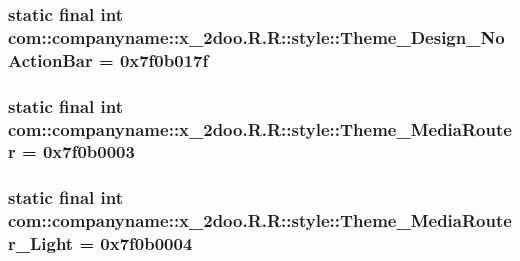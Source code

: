 \hypertarget{classcom_1_1companyname_1_1x__2doo_1_1_r_1_1style_4f51a6c9f0caaacc7bfe8180321de0b0}{
\subsubsection[{Theme\_\-Design\_\-NoActionBar}]{\setlength{\rightskip}{0pt plus 5cm}static final int com::companyname::x\_\-2doo.R.R::style::Theme\_\-Design\_\-NoActionBar = 0x7f0b017f}}
\label{classcom_1_1companyname_1_1x__2doo_1_1_r_1_1style_4f51a6c9f0caaacc7bfe8180321de0b0}


\hypertarget{classcom_1_1companyname_1_1x__2doo_1_1_r_1_1style_77d889db53bd927bca2357dab52a6274}{
\subsubsection[{Theme\_\-MediaRouter}]{\setlength{\rightskip}{0pt plus 5cm}static final int com::companyname::x\_\-2doo.R.R::style::Theme\_\-MediaRouter = 0x7f0b0003}}
\label{classcom_1_1companyname_1_1x__2doo_1_1_r_1_1style_77d889db53bd927bca2357dab52a6274}


\hypertarget{classcom_1_1companyname_1_1x__2doo_1_1_r_1_1style_f6a692467232a21166425a0ff9651444}{
\subsubsection[{Theme\_\-MediaRouter\_\-Light}]{\setlength{\rightskip}{0pt plus 5cm}static final int com::companyname::x\_\-2doo.R.R::style::Theme\_\-MediaRouter\_\-Light = 0x7f0b0004}}
\label{classcom_1_1companyname_1_1x__2doo_1_1_r_1_1style_f6a692467232a21166425a0ff9651444}


